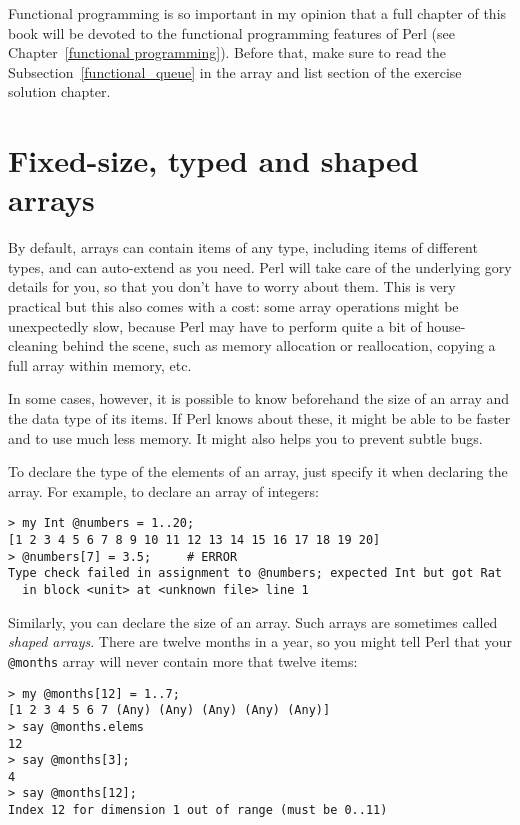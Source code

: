 Functional programming is so important in my opinion that a full chapter 
of this book will be devoted to the functional programming 
features of Perl (see Chapter~\ref{functional programming}). 
Before that, make sure to read the Subsection~\ref{functional_queue} 
in the array and list section of the exercise solution chapter.

\section{Fixed-size, typed and shaped arrays}

By default, arrays can contain items of any type, including 
items of different types, and can auto-extend as you need. 
Perl will take care of the underlying gory details for you, 
so that you don't have to worry about them. This is very 
practical but this also comes with a cost: some array 
operations might be unexpectedly slow, because Perl may 
have to perform quite a bit of house-cleaning behind the 
scene, such as memory allocation or reallocation, copying 
a full array within memory, etc.

In some cases, however, it is possible to know beforehand 
the size of an array and the data type of its items. If 
Perl knows about these, it might be able to be faster and 
to use much less memory. It might also helps you 
to prevent subtle bugs.

To declare the type of the elements of an array, just 
specify it when declaring the array. For example, to 
declare an array of integers:

\begin{verbatim}
> my Int @numbers = 1..20;
[1 2 3 4 5 6 7 8 9 10 11 12 13 14 15 16 17 18 19 20]
> @numbers[7] = 3.5;     # ERROR
Type check failed in assignment to @numbers; expected Int but got Rat
  in block <unit> at <unknown file> line 1
\end{verbatim}
%

Similarly, you can declare the size of an array. Such arrays 
are sometimes called \emph{shaped arrays}. There are 
twelve months in a year, so you might tell Perl that your 
\verb'@months' array will never contain more that twelve 
items:
\begin{verbatim}
> my @months[12] = 1..7;
[1 2 3 4 5 6 7 (Any) (Any) (Any) (Any) (Any)]
> say @months.elems
12
> say @months[3];
4
> say @months[12];
Index 12 for dimension 1 out of range (must be 0..11)
\end{verbatim}
%

